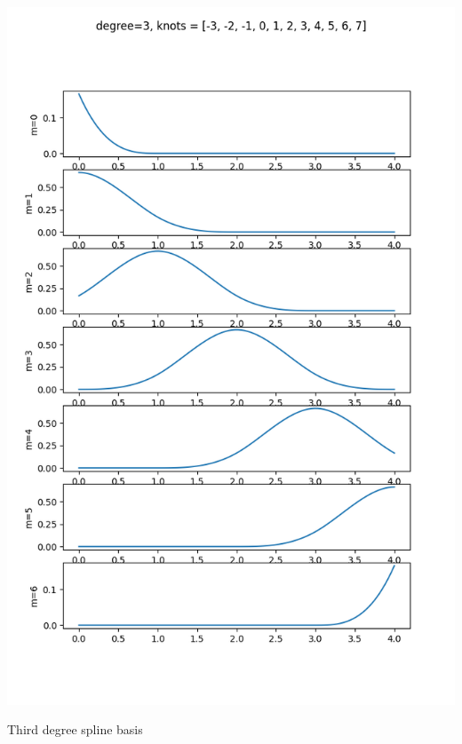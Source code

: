 \begin{marginfigure}[0in]
  \includegraphics[width=\linewidth]{./chap5_trajectory_planning/figures/spline_basis_3}
  \caption{Third degree spline basis}
  \label{fig:spline_basis_3}  
\end{marginfigure}

